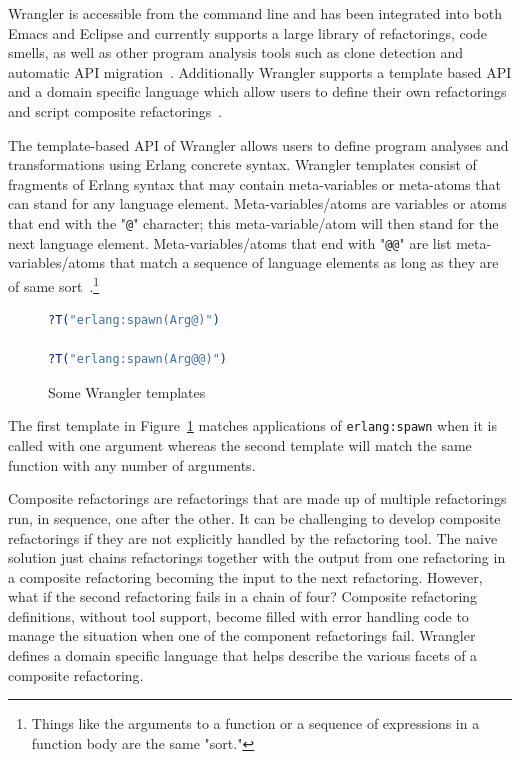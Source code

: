 Wrangler is accessible from the command line and has been integrated into both Emacs and Eclipse and currently supports a large library of refactorings, code smells, as well as other program analysis tools such as clone detection and automatic API migration~\citep{wrangler}. Additionally Wrangler supports a template based API and a domain specific language which allow users to define their own refactorings and script composite refactorings~\citep{wranglerDomain}.

The template-based API of Wrangler allows users to define program analyses and transformations using Erlang concrete syntax. Wrangler templates consist of fragments of Erlang syntax that may contain meta-variables or meta-atoms that can stand for any language element. Meta-variables/atoms are variables or atoms that end with the "\texttt{@}" character; this meta-variable/atom will then stand for the next language element. Meta-variables/atoms that end with "\texttt{@@}" are list meta-variables/atoms that match a sequence of language elements as long as they are of same sort~\citep{letsUser}.\footnote{Things like the arguments to a function or a sequence of expressions in a function body are the same "sort."}

\begin{figure}[t]
\begin{lstlisting}[language=erlang]
?T("erlang:spawn(Arg@)")

?T("erlang:spawn(Arg@@)")
\end{lstlisting}
\caption{Some Wrangler templates}
\label{templates}
\end{figure}

The first template in Figure~\ref{templates} matches applications of \texttt{erlang:spawn} when it is called with one argument whereas the second template will match the same function with any number of arguments.

Composite refactorings are refactorings that are made up of multiple refactorings run, in sequence, one after the other. It can be challenging to develop composite refactorings if they are not explicitly handled by the refactoring tool. The naive solution just chains refactorings together with the output from one refactoring in a composite refactoring becoming the input to the next refactoring. However, what if the second refactoring fails in a chain of four? Composite refactoring definitions, without tool support, become filled with error handling code to manage the situation when one of the component refactorings fail. Wrangler defines a domain specific language that helps describe the various facets of a composite refactoring.

